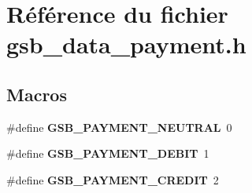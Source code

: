 \section{Référence du fichier gsb\_\-data\_\-payment.h}
\label{gsb__data__payment_8h}
\subsection*{Macros}
\begin{DoxyCompactItemize}
\item 
\#define {\bf GSB\_\-PAYMENT\_\-NEUTRAL}~0
\item 
\#define {\bf GSB\_\-PAYMENT\_\-DEBIT}~1
\item 
\#define {\bf GSB\_\-PAYMENT\_\-CREDIT}~2
\end{DoxyCompactItemize}

